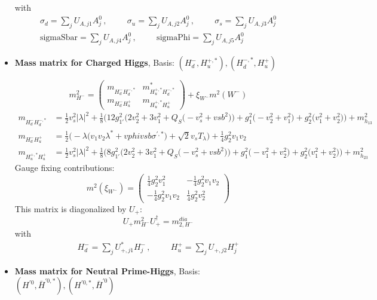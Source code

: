 \begin{itemize}
with 
\begin{align} 
\sigma_{d} = \sum_{j}U_{A,{j 1}}A^0_{{j}}\,, \hspace{1cm} 
\sigma_{u} = \sum_{j}U_{A,{j 2}}A^0_{{j}}\,, \hspace{1cm} 
\sigma_s = \sum_{j}U_{A,{j 3}}A^0_{{j}}\\ 
\text{sigmaSbar} = \sum_{j}U_{A,{j 4}}A^0_{{j}}\,, \hspace{1cm} 
\text{sigmaPhi} = \sum_{j}U_{A,{j 5}}A^0_{{j}}
\end{align} 
\item {\bf Mass matrix for Charged Higgs}, Basis: \( \left(H_d^-, H_u^{+,*}\right), \left(H_d^{-,*}, H_u^+\right) \) 
 
\begin{equation} 
m^2_{H^-} = \left( 
\begin{array}{cc}
m_{H_d^-H_d^{-,*}} &m^*_{H_u^{+,*}H_d^{-,*}}\\ 
m_{H_d^-H_u^+} &m_{H_u^{+,*}H_u^+}\end{array} 
\right) +  \xi_{W^-}m^2(W^-) 
 \end{equation} 
\begin{align} 
m_{H_d^-H_d^{-,*}} &= \frac{1}{2} v_{s}^{2} |\lambda|^2  + \frac{1}{8} \Big(12 g_{1'}^{2} \Big(2 v_{2}^{2}  + 3 v_{1}^{2}  + Q_{S} \Big(- v_{s}^{2}  + vsb^{2}\Big)\Big) + g_{1}^{2} \Big(- v_{2}^{2}  + v_{1}^{2}\Big) + g_{2}^{2} \Big(v_{1}^{2} + v_{2}^{2}\Big)\Big) + m_{h_{13}}^2\\ 
m_{H_d^-H_u^+} &= \frac{1}{2} \Big(- \lambda \Big(v_1 v_2 \lambda^*  + vphi vsb \sigma^{\prime,*} \Big) + \sqrt{2} v_s T_{\lambda} \Big) + \frac{1}{4} g_{2}^{2} v_1 v_2 \\ 
m_{H_u^{+,*}H_u^+} &= \frac{1}{2} v_{s}^{2} |\lambda|^2  + \frac{1}{8} \Big(8 g_{1'}^{2} \Big(2 v_{2}^{2}  + 3 v_{1}^{2}  + Q_{S} \Big(- v_{s}^{2}  + vsb^{2}\Big)\Big) + g_{1}^{2} \Big(- v_{1}^{2}  + v_{2}^{2}\Big) + g_{2}^{2} \Big(v_{1}^{2} + v_{2}^{2}\Big)\Big) + m_{h_{23}}^2
\end{align} 
Gauge fixing contributions: 
\begin{equation} 
m^2 (\xi_{W^-}) = \left( 
\begin{array}{cc}
\frac{1}{4} g_{2}^{2} v_{1}^{2}  &-\frac{1}{4} g_{2}^{2} v_1 v_2 \\ 
-\frac{1}{4} g_{2}^{2} v_1 v_2  &\frac{1}{4} g_{2}^{2} v_{2}^{2} \end{array} 
\right) 
 \end{equation} 
This matrix is diagonalized by \(U_{+}\): 
\begin{equation} 
U_{+} m^2_{H^-} U_{+}^{\dagger} = m^{dia}_{2,H^-} 
\end{equation} 
with 
\begin{align} 
H_d^- = \sum_{j}U^*_{{+},{j 1}}H^-_{{j}}\,, \hspace{1cm} 
H_u^+ = \sum_{j}U_{+,{j 2}}H^+_{{j}}
\end{align} 
\item {\bf Mass matrix for Neutral Prime-Higgs}, Basis: \( \left(H^{'0}, \bar{H}^{{'0},*}\right), \left(H^{{'0},*}, \bar{H}^{'0}\right) \) 
 

\end{itemize}
